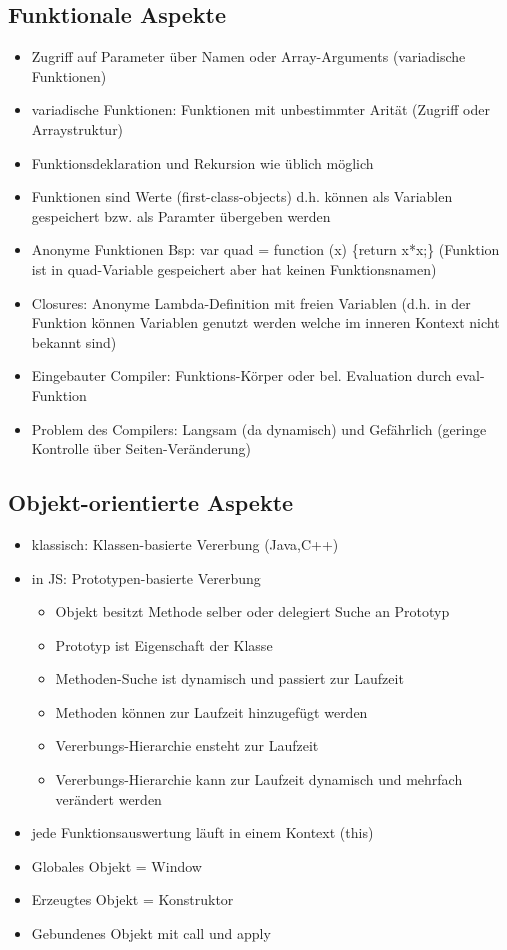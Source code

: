 \documentclass{article} %
\begin{document}
	\subsection{Funktionale Aspekte}
	\begin{itemize}
		\item Zugriff auf Parameter über Namen oder Array-Arguments (variadische Funktionen)
		\item variadische Funktionen: Funktionen mit unbestimmter Arität (Zugriff oder Arraystruktur)
		\item Funktionsdeklaration und Rekursion wie üblich möglich
		\item Funktionen sind Werte (first-class-objects) d.h. können als Variablen gespeichert bzw. als Paramter übergeben werden
		\item Anonyme Funktionen Bsp: var quad = function (x) \{return x*x;\} (Funktion ist in quad-Variable gespeichert aber hat keinen Funktionsnamen)
		\item Closures: Anonyme Lambda-Definition mit freien Variablen (d.h. in der Funktion können Variablen genutzt werden welche im inneren Kontext nicht bekannt sind)
		\item Eingebauter Compiler: Funktions-Körper oder bel. Evaluation durch eval-Funktion
		\item Problem des Compilers: Langsam (da dynamisch) und Gefährlich (geringe Kontrolle über Seiten-Veränderung)
	\end{itemize}
	\subsection{Objekt-orientierte Aspekte}
	\begin{itemize}
		\item klassisch: Klassen-basierte Vererbung (Java,C++)
		\item in JS: Prototypen-basierte Vererbung
		\begin{itemize}
			\item Objekt besitzt Methode selber oder delegiert Suche an Prototyp
			\item Prototyp ist Eigenschaft der Klasse
			\item Methoden-Suche ist dynamisch und passiert zur Laufzeit
			\item Methoden können zur Laufzeit hinzugefügt werden
			\item Vererbungs-Hierarchie ensteht zur Laufzeit
			\item Vererbungs-Hierarchie kann zur Laufzeit dynamisch und mehrfach verändert werden
		\end{itemize}
		\item jede Funktionsauswertung läuft in einem Kontext (this)
		\item Globales Objekt = Window 
		\item Erzeugtes Objekt = Konstruktor
		\item Gebundenes Objekt mit call und apply
	\end{itemize}
\end{document}
